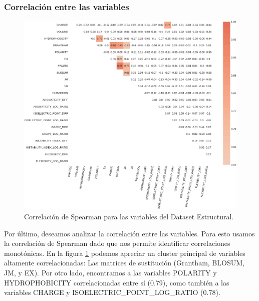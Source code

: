 \subsubsection{Correlación entre las variables}

\begin{figure}[H]
    \centering
    \includegraphics[scale=0.25]{documents/latex/figures/3/structural/structural_corr.pdf}
    \caption{Correlación de Spearman para las variables del Dataset Estructural.}
    \label{fig:corrplot_structural}
\end{figure}

Por último, deseamos analizar la correlación entre las variables. Para esto usamos la correlación de Spearman dado que nos permite identificar correlaciones monotónicas. En la figura \ref{fig:corrplot_structural} podemos apreciar un cluster principal de variables altamente correlacionadas: Las matrices de sustitución (Grantham, BLOSUM, JM, y EX). Por otro lado, encontramos a las variables POLARITY y HYDROPHOBICITY correlacionadas entre sí (0.79), como también a las variables CHARGE y ISOELECTRIC\_POINT\_LOG\_RATIO (0.78).





